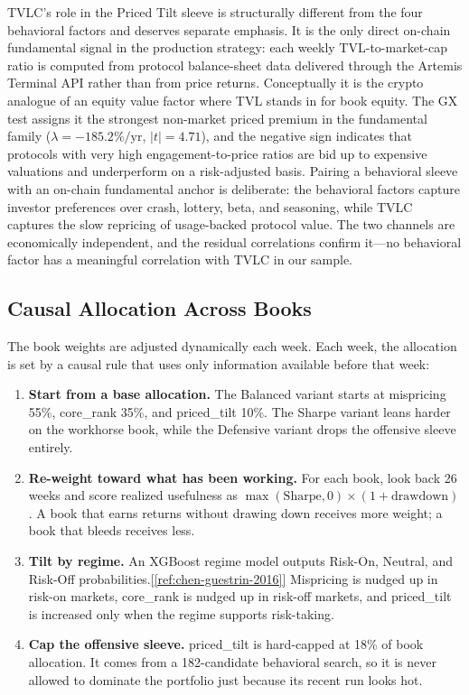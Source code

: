 \documentclass[11pt,a4paper]{article}
\newcommand{\ieeecite}[1]{\hyperref[ref:#1]{[\ref*{ref:#1}]}}
\begin{document}
TVLC's role in the Priced Tilt sleeve is structurally different from the four behavioral factors and deserves separate emphasis. It is the only direct on-chain fundamental signal in the production strategy: each weekly TVL-to-market-cap ratio is computed from protocol balance-sheet data delivered through the Artemis Terminal API rather than from price returns. Conceptually it is the crypto analogue of an equity value factor where TVL stands in for book equity. The GX test assigns it the strongest non-market priced premium in the fundamental family ($\lambda = -185.2\%/\text{yr}$, $|t| = 4.71$), and the negative sign indicates that protocols with very high engagement-to-price ratios are bid up to expensive valuations and underperform on a risk-adjusted basis. Pairing a behavioral sleeve with an on-chain fundamental anchor is deliberate: the behavioral factors capture investor preferences over crash, lottery, beta, and seasoning, while TVLC captures the slow repricing of usage-backed protocol value. The two channels are economically independent, and the residual correlations confirm it---no behavioral factor has a meaningful correlation with TVLC in our sample.

\subsection{Causal Allocation Across Books}

The book weights are adjusted dynamically each week. Each week, the allocation is set by a causal rule that uses only information available before that week:

\begin{enumerate}[nosep]
  \item \textbf{Start from a base allocation.} The Balanced variant starts at mispricing 55\%, core\_rank 35\%, and priced\_tilt 10\%. The Sharpe variant leans harder on the workhorse book, while the Defensive variant drops the offensive sleeve entirely.
  \item \textbf{Re-weight toward what has been working.} For each book, look back 26 weeks and score realized usefulness as $\max(\text{Sharpe},0)\times(1+\text{drawdown})$. A book that earns returns without drawing down receives more weight; a book that bleeds receives less.
  \item \textbf{Tilt by regime.} An XGBoost regime model outputs Risk-On, Neutral, and Risk-Off probabilities.\ieeecite{chen-guestrin-2016} Mispricing is nudged up in risk-on markets, core\_rank is nudged up in risk-off markets, and priced\_tilt is increased only when the regime supports risk-taking.
  \item \textbf{Cap the offensive sleeve.} priced\_tilt is hard-capped at 18\% of book allocation. It comes from a 182-candidate behavioral search, so it is never allowed to dominate the portfolio just because its recent run looks hot.
\end{enumerate}
\end{document}
